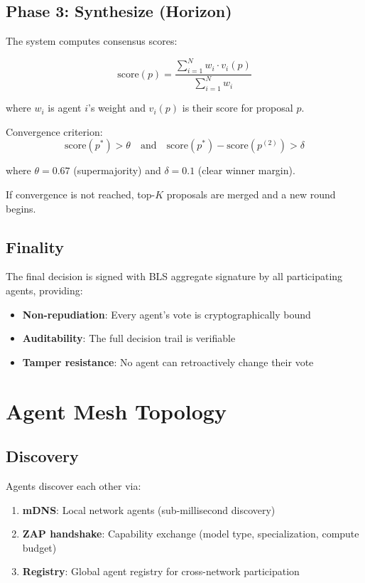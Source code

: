 \documentclass[11pt,a4paper]{article}
\begin{document}
\subsection{Phase 3: Synthesize (Horizon)}

The system computes consensus scores:

$$\text{score}(p) = \frac{\sum_{i=1}^{N} w_i \cdot v_i(p)}{\sum_{i=1}^{N} w_i}$$

where $w_i$ is agent $i$'s weight and $v_i(p)$ is their score for proposal $p$.

Convergence criterion:
$$\text{score}(p^*) > \theta \quad \text{and} \quad \text{score}(p^*) - \text{score}(p^{(2)}) > \delta$$

where $\theta = 0.67$ (supermajority) and $\delta = 0.1$ (clear winner margin).

If convergence is not reached, top-$K$ proposals are merged and a new round begins.

\subsection{Finality}

The final decision is signed with BLS aggregate signature by all participating agents, providing:

\begin{itemize}[leftmargin=2em]
\item \textbf{Non-repudiation}: Every agent's vote is cryptographically bound
\item \textbf{Auditability}: The full decision trail is verifiable
\item \textbf{Tamper resistance}: No agent can retroactively change their vote
\end{itemize}

\section{Agent Mesh Topology}

\subsection{Discovery}

Agents discover each other via:
\begin{enumerate}[leftmargin=2em]
\item \textbf{mDNS}: Local network agents (sub-millisecond discovery)
\item \textbf{ZAP handshake}: Capability exchange (model type, specialization, compute budget)
\item \textbf{Registry}: Global agent registry for cross-network participation
\end{enumerate}
\end{document}
